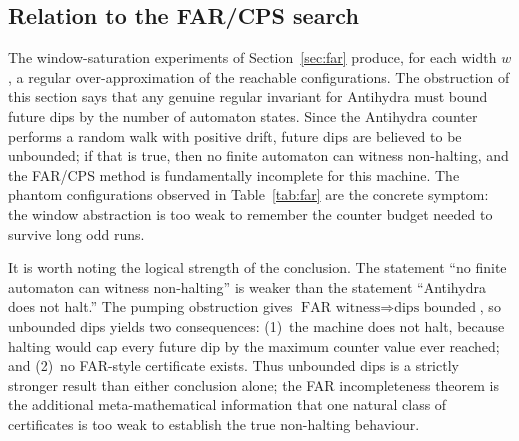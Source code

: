 \documentclass[11pt,a4paper]{article}
\theoremstyle{definition}
\begin{document}
\subsection{Relation to the FAR/CPS search}

The window-saturation experiments of Section~\ref{sec:far} produce, for
each width $w$, a regular over-approximation of the reachable
configurations.  The obstruction of this section says that any genuine
regular invariant for Antihydra must bound future dips by the number of
automaton states.  Since the Antihydra counter performs a random walk with
positive drift, future dips are believed to be unbounded; if that is true,
then no finite automaton can witness non-halting, and the FAR/CPS method is
fundamentally incomplete for this machine.  The phantom configurations
observed in Table~\ref{tab:far} are the concrete symptom: the window
abstraction is too weak to remember the counter budget needed to survive
long odd runs.

It is worth noting the logical strength of the conclusion.  The statement
``no finite automaton can witness non-halting'' is weaker than the
statement ``Antihydra does not halt.''  The pumping obstruction gives
$\text{FAR witness}\Rightarrow\text{dips bounded}$, so unbounded dips
yields two consequences: (1)~the machine does not halt, because halting
would cap every future dip by the maximum counter value ever reached;
and (2)~no FAR-style certificate exists.  Thus unbounded dips is a
strictly stronger result than either conclusion alone; the FAR
incompleteness theorem is the additional meta-mathematical information
that one natural class of certificates is too weak to establish the
true non-halting behaviour.
\end{document}
